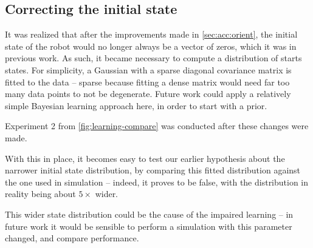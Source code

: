 \documentclass[main.tex]{subfiles}
\begin{document}
\subsection{Correcting the initial state}

	It was realized that after the improvements made in \cref{sec:acc:orient}, the initial state of the robot would no longer always be a vector of zeros, which it was in previous work.
	As such, it became necessary to compute a distribution of starts states.
	For simplicity, a Gaussian with a sparse diagonal covariance matrix is fitted to the data -- sparse because fitting a dense matrix would need far too many data points to not be degenerate. Future work could apply a relatively simple Bayesian learning approach here, in order to start with a prior.

	Experiment 2 from \cref{fig:learning-compare} was conducted after these changes were made.

	With this in place, it becomes easy to test our earlier hypothesis about the narrower initial state distribution, by comparing this fitted distribution against the one used in simulation -- indeed, it proves to be false, with the distribution in reality being about $5\times$ wider\footnotemark.

	This wider state distribution could be the cause of the impaired learning -- in future work it would be sensible to perform a simulation with this parameter changed, and compare performance.



\bib
\end{document}
